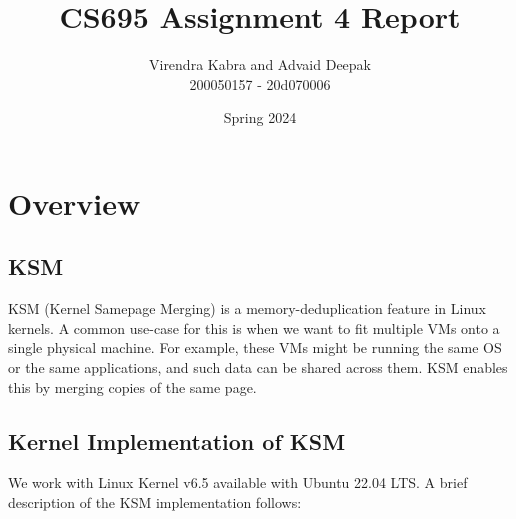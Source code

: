 \documentclass{article}
\title{CS695 Assignment 4 Report}
\author{Virendra Kabra and Advaid Deepak \\ 200050157 - 20d070006}
\date{Spring 2024}
\begin{document}
\maketitle
\tableofcontents
\newpage

\section{Overview}

\subsection{KSM}

KSM (Kernel Samepage Merging) \cite{ksm_doc} is a memory-deduplication feature in Linux kernels. A common use-case for this is when we want to fit multiple VMs onto a single physical machine. For example, these VMs might be running the same OS or the same applications, and such data can be shared across them. KSM enables this by merging copies of the same page.

\subsection{Kernel Implementation of KSM}

We work with Linux Kernel v6.5 available with Ubuntu 22.04 LTS. A brief description of the KSM implementation \cite{ksm_impl} follows:
\end{document}
